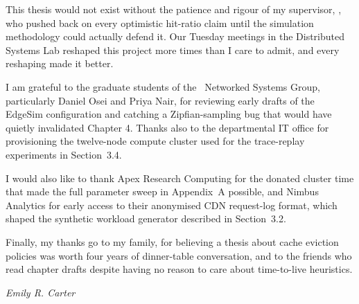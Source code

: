 
This thesis would not exist without the patience and rigour of my supervisor,
\thesissupervisor, who pushed back on every optimistic hit-ratio claim until the simulation
methodology could actually defend it. Our Tuesday meetings in the Distributed Systems Lab
reshaped this project more times than I care to admit, and every reshaping made it better.

I am grateful to the graduate students of the \thesisuniversity\ Networked Systems Group,
particularly Daniel Osei and Priya Nair, for reviewing early drafts of the EdgeSim
configuration and catching a Zipfian-sampling bug that would have quietly invalidated
Chapter 4. Thanks also to the departmental IT office for provisioning the twelve-node
compute cluster used for the trace-replay experiments in Section~3.4.

I would also like to thank Apex Research Computing for the donated cluster time that made
the full parameter sweep in Appendix~A possible, and Nimbus Analytics for early access to
their anonymised CDN request-log format, which shaped the synthetic workload generator
described in Section~3.2.

Finally, my thanks go to my family, for believing a thesis about cache eviction policies was
worth four years of dinner-table conversation, and to the friends who read chapter drafts
despite having no reason to care about time-to-live heuristics.

\vspace{0.8cm}
\begin{flushright}
\emph{Emily R. Carter}\\
\thesisdate
\end{flushright}
